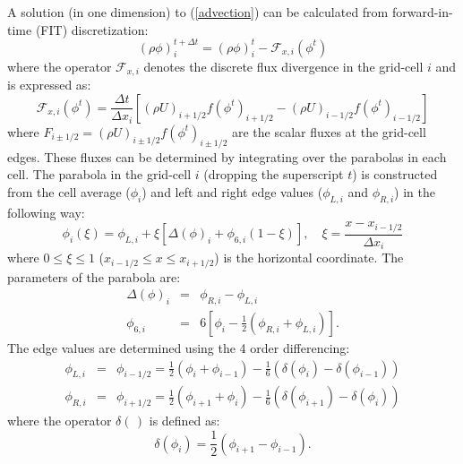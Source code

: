   A solution (in one dimension) to (\ref{advection}) can be calculated
  from forward-in-time (FIT) discretization:
  \begin{equation}
    \label{1DFIT}
    (\rho \phi)_{i}^{t+\Delta t} = (\rho \phi)_{i}^{t} -
    \mathcal{F}_{x,i}(\phi^{t})    
  \end{equation}
  where the operator $\mathcal{F}_{x,i}$ denotes the discrete flux
  divergence in the grid-cell $i$ and is expressed as:
  \begin{equation}
    \label{FIT}
    \mathcal{F}_{x,i}(\phi^{t}) = \frac{\Delta t}{\Delta x_{i}} \left[
      (\rho U)_{i+1/2} f(\phi^{t})_{i+1/2} - (\rho U)_{i-1/2}
      f(\phi^{t})_{i-1/2} \right] 
  \end{equation}
  where $F_{i\pm1/2}=(\rho U)_{i\pm1/2} f(\phi^{t})_{i\pm1/2}$ are the
  scalar fluxes at the grid-cell edges. These fluxes can be determined
  by integrating over the parabolas in each cell. The parabola in the
  grid-cell $i$ (dropping the superscript $t$) is constructed from the
  cell average ($\phi_{i}$) and left and right edge values ($\phi_{L,i}$
  and $\phi_{R,i}$) in the following way:
  \begin{equation}
    \label{par}
    \phi_{i}(\xi) = \phi_{L,i} + \xi \left[ \Delta(\phi)_{i} +
      \phi_{6,i} \left ( 1- \xi \right ) \right ], \quad \xi = \frac{x -
      x_{i-1/2}}{\Delta x_{i}}
  \end{equation}
  where $0 \le \xi \le 1$ ($x_{i-1/2} \le x \le x_{i+1/2}$) is the
  horizontal coordinate. The parameters of the parabola are:
  \begin{eqnarray}
    \Delta(\phi)_{i} & = & \phi_{R,i} - \phi_{L,i}\\
    \phi_{6,i} & = & 6 \left[\phi_{i} - \frac{1}{2}\left (\phi_{R,i} +
    \phi_{L,i} \right ) \right ].
  \end{eqnarray}
  The edge values are determined using the 4 order differencing:
  \begin{eqnarray}
    \label{edgevalues1}
    \phi_{L,i} &=& \phi_{i-1/2} = \frac{1}{2}\left ( \phi_{i} + \phi_{i-1}
    \right ) - \frac{1}{6}\left ( \delta(\phi_{i}) - \delta(\phi_{i-1})
    \right )\\
    \label{edgevalues2}
    \phi_{R,i} &=& \phi_{i+1/2} = \frac{1}{2}\left ( \phi_{i+1} + \phi_{i}
    \right ) - \frac{1}{6}\left ( \delta(\phi_{i+1}) - \delta(\phi_{i})
    \right )
  \end{eqnarray}
  where the operator $\delta(\,)$ is defined as:
  \begin{equation}
    \label{endpar}
    \delta(\phi_{i}) = \frac{1}{2} \left( \phi_{i+1} - \phi_{i-1} \right).
  \end{equation}  
